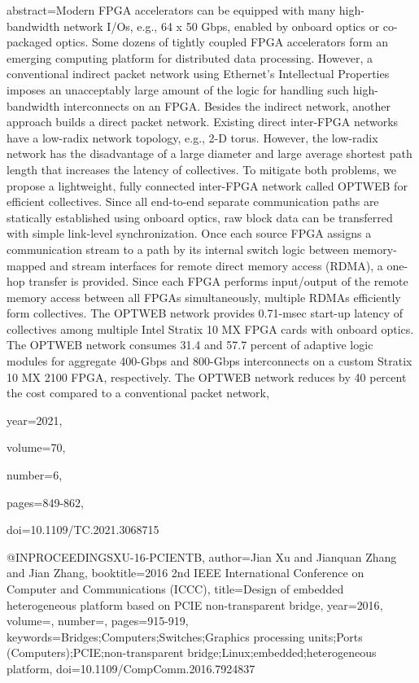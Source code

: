 {{  abstract={Modern FPGA accelerators can be equipped with many high-bandwidth network I/Os, e.g., 64 x 50 Gbps, enabled by
onboard optics or co-packaged optics. Some dozens of tightly coupled FPGA accelerators form an emerging computing platform for
distributed data processing. However, a conventional indirect packet network using Ethernet’s Intellectual Properties imposes an
unacceptably large amount of the logic for handling such high-bandwidth interconnects on an FPGA. Besides the indirect network,
another approach builds a direct packet network. Existing direct inter-FPGA networks have a low-radix network topology, e.g., 2-D
torus. However, the low-radix network has the disadvantage of a large diameter and large average shortest path length that increases
the latency of collectives. To mitigate both problems, we propose a lightweight, fully connected inter-FPGA network called OPTWEB for
efficient collectives. Since all end-to-end separate communication paths are statically established using onboard optics, raw block data
can be transferred with simple link-level synchronization. Once each source FPGA assigns a communication stream to a path by its
internal switch logic between memory-mapped and stream interfaces for remote direct memory access (RDMA), a one-hop transfer is
provided. Since each FPGA performs input/output of the remote memory access between all FPGAs simultaneously, multiple RDMAs
efficiently form collectives. The OPTWEB network provides 0.71-msec start-up latency of collectives among multiple Intel Stratix 10 MX
FPGA cards with onboard optics. The OPTWEB network consumes 31.4 and 57.7 percent of adaptive logic modules for aggregate
400-Gbps and 800-Gbps interconnects on a custom Stratix 10 MX 2100 FPGA, respectively. The OPTWEB network reduces by 40
percent the cost compared to a conventional packet network},

  year={2021},

  volume={70},

  number={6},

  pages={849-862},

  doi={10.1109/TC.2021.3068715}}

@INPROCEEDINGS{XU-16-PCIENTB,
  author={Jian Xu and Jianquan Zhang and Jian Zhang},
  booktitle={2016 2nd IEEE International Conference on Computer and Communications (ICCC)}, 
  title={Design of embedded heterogeneous platform based on PCIE non-transparent bridge}, 
  year={2016},
  volume={},
  number={},
  pages={915-919},
  keywords={Bridges;Computers;Switches;Graphics processing units;Ports (Computers);PCIE;non-transparent bridge;Linux;embedded;heterogeneous platform},
  doi={10.1109/CompComm.2016.7924837}}


}
